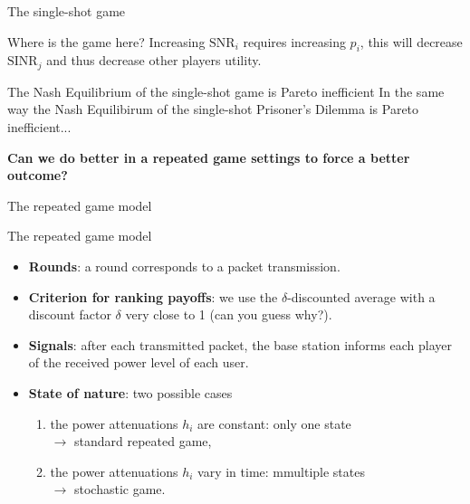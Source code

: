 \begin{frame}{The single-shot game}
    \begin{block}{Where is the game here?}
        Increasing $\text{SNR}_i$ requires increasing $p_i$, this will decrease $\text{SINR}_j$ and
        thus decrease other players utility.
    \end{block}
    \pause 
    \vspace{0.5cm}
    \begin{alertblock}{The Nash Equilibrium of the single-shot game is Pareto inefficient}
        In the same way the Nash Equilibirum of the single-shot Prisoner's Dilemma is
        Pareto inefficient...
    \end{alertblock}
    \pause
    \vspace{0.5cm}
    \textbf{{\color{green}Can we do better in a repeated game settings to force a better outcome?}}
\end{frame}

\begin{frame}{The repeated game model}
    \begin{exampleblock}{The repeated game model}
        \begin{itemize}
            \pause
            \item \textbf{Rounds}: a round corresponds to a packet transmission.
            \pause
            \item \textbf{Criterion for ranking payoffs}: we use the $\delta$-discounted average with a
            discount factor $\delta$ very close to 1 (can you guess why?).
            \pause
            \item \textbf{Signals}: after each transmitted packet, the base station informs each player
            of the received power level of each user.
            \pause
            \item \textbf{State of nature}: two possible cases
            \begin{enumerate}
                \pause
                \item the power attenuations $h_i$ are constant: only one state\\
                $\to$ standard repeated game,
                \pause
                \item the power attenuations $h_i$ vary in time: mmultiple states\\
                $\to$ stochastic game.
            \end{enumerate}
        \end{itemize}
    \end{exampleblock}
\end{frame}

